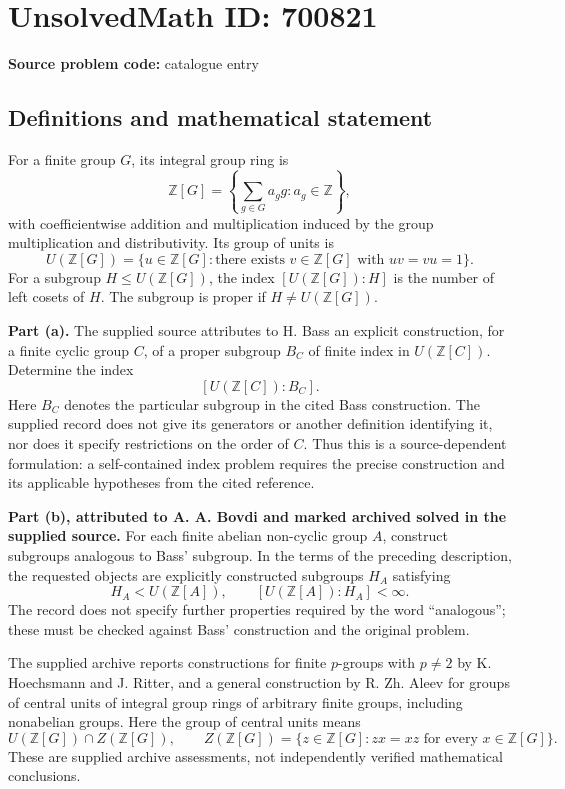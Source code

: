 \documentclass[11pt]{article}
\newcommand{\Z}{\mathbb{Z}}
\begin{document}
\section*{UnsolvedMath ID: 700821}
\textbf{Source problem code:} catalogue entry
\subsection{Definitions and mathematical statement}
For a finite group \(G\), its integral group ring is
\[
\Z[G]=\left\{\sum_{g\in G}a_g g:a_g\in\Z\right\},
\]
with coefficientwise addition and multiplication induced by the group multiplication and distributivity. Its group of units is
\[
U(\Z[G])=\{u\in\Z[G]:\text{there exists }v\in\Z[G]\text{ with }uv=vu=1\}.
\]
For a subgroup \(H\leq U(\Z[G])\), the index \([U(\Z[G]):H]\) is the number of left cosets of \(H\). The subgroup is proper if \(H\neq U(\Z[G])\).

\textbf{Part (a).} The supplied source attributes to H. Bass an explicit construction, for a finite cyclic group \(C\), of a proper subgroup \(B_C\) of finite index in \(U(\Z[C])\). Determine the index
\[
[U(\Z[C]):B_C].
\]
Here \(B_C\) denotes the particular subgroup in the cited Bass construction. The supplied record does not give its generators or another definition identifying it, nor does it specify restrictions on the order of \(C\). Thus this is a source-dependent formulation: a self-contained index problem requires the precise construction and its applicable hypotheses from the cited reference.

\textbf{Part (b), attributed to A. A. Bovdi and marked archived solved in the supplied source.} For each finite abelian non-cyclic group \(A\), construct subgroups analogous to Bass' subgroup. In the terms of the preceding description, the requested objects are explicitly constructed subgroups \(H_A\) satisfying
\[
H_A<U(\Z[A]),\qquad [U(\Z[A]):H_A]<\infty.
\]
The record does not specify further properties required by the word ``analogous''; these must be checked against Bass' construction and the original problem.

The supplied archive reports constructions for finite \(p\)-groups with \(p\neq2\) by K. Hoechsmann and J. Ritter, and a general construction by R. Zh. Aleev for groups of central units of integral group rings of arbitrary finite groups, including nonabelian groups. Here the group of central units means
\[
U(\Z[G])\cap Z(\Z[G]),\qquad
Z(\Z[G])=\{z\in\Z[G]:zx=xz\text{ for every }x\in\Z[G]\}.
\]
These are supplied archive assessments, not independently verified mathematical conclusions.
\end{document}
